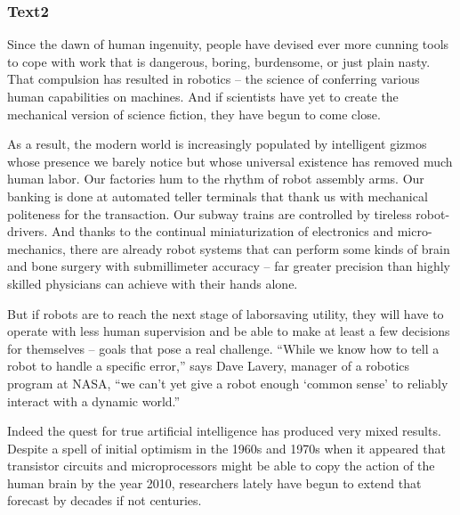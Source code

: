 \documentclass[a4paper]{article}
\begin{document}
\subsubsection{Text2}

\par
Since the dawn of human ingenuity, people have devised ever more cunning tools to cope with work that is dangerous, boring, burdensome, or just plain nasty. That compulsion has resulted in robotics -- the science of conferring various human capabilities on machines. And if scientists have yet to create the mechanical version of science fiction, they have begun to come close.

\par
As a result, the modern world is increasingly populated by intelligent gizmos whose presence we barely notice but whose universal existence has removed much human labor. Our factories hum to the rhythm of robot assembly arms. Our banking is done at automated teller terminals that thank us with mechanical politeness for the transaction. Our subway trains are controlled by tireless robot-drivers. And thanks to the continual miniaturization of electronics and micro-mechanics, there are already robot systems that can perform some kinds of brain and bone surgery with submillimeter accuracy -- far greater precision than highly skilled physicians can achieve with their hands alone.

\par
But if robots are to reach the next stage of laborsaving utility, they will have to operate with less human supervision and be able to make at least a few decisions for themselves -- goals that pose a real challenge. “While we know how to tell a robot to handle a specific error,” says Dave Lavery, manager of a robotics program at NASA, “we can’t yet give a robot enough ‘common sense’ to reliably interact with a dynamic world.”

\par
Indeed the quest for true artificial intelligence has produced very mixed results. Despite a spell of initial optimism in the 1960s and 1970s when it appeared that transistor circuits and microprocessors might be able to copy the action of the human brain by the year 2010, researchers lately have begun to extend that forecast by decades if not centuries.
\end{document}
